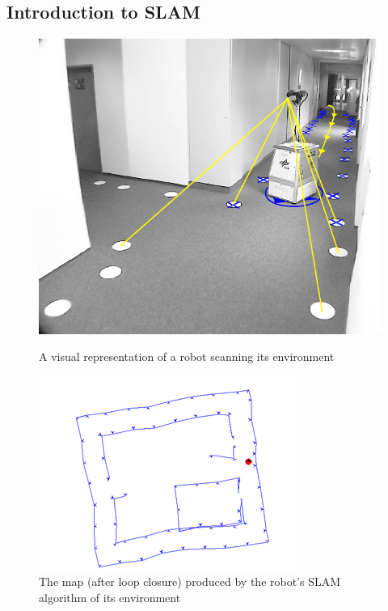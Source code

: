 \documentclass[12pt]{article}
\begin{document}
\subsection{Introduction to SLAM} %

\begin{figure}[h]
    \centering
    \begin{minipage}{0.45\textwidth}
        \centering
        \includegraphics[width=\linewidth]{SLAM_agent} %
        \caption[Short caption]{A visual representation of a robot scanning its environment \cite{SLAM_overview}}
        \label{fig:SLAM_agent}
    \end{minipage}\hfill
    \begin{minipage}{0.45\textwidth}
        \centering
        \includegraphics[width=\linewidth]{SLAM_map} %
        \caption[Short caption]{The map (after loop closure) produced by the robot's SLAM algorithm of its environment \cite{SLAM_overview}}
        \label{fig:SLAM_map}
    \end{minipage}
\end{figure}
\end{document}
